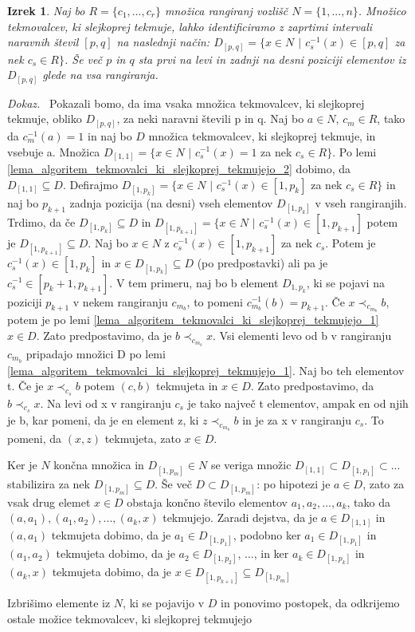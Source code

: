 \documentclass[a4paper, 12pt]{book}
\newtheorem{izrek}{Izrek}[chapter]
\newenvironment{dokaz}{\emph{Dokaz.}\ }{\hspace{\fill}{$\Box$}}
\begin{document}
\begin{izrek}
    Naj bo $R = \{ c_1, ..., c_r \}$ množica rangiranj vozlišč $N = \{ 1, ..., n \}$. Množico tekmovalcev, ki slejkoprej tekmuje, lahko identificiramo z zaprtimi intervali naravnih števil $[p, q]$ na naslednji način: $D_{[p, q]} = \{ x \in N$ $|$ $c_s^{-1}(x) \in [p, q]$ za nek $ c_s \in R\}$. Še več $p$ in $q$ sta prvi na levi in zadnji na desni poziciji elementov iz $D_{[p, q]}$ glede na vsa rangiranja.
\end{izrek}
\begin{dokaz}
    Pokazali bomo, da ima vsaka množica tekmovalcev, ki slejkoprej tekmuje, obliko $D_{[p, q]}$, za neki naravni števili p in q. Naj bo $a \in N$, $c_m \in R$, tako da $c_m^{-1}(a) = 1$ in naj bo $D$ množica tekmovalcev, ki slejkoprej tekmuje, in vsebuje a. Množica $D_{[1,1]} = \{ x \in N $ $|$ $c_s^{-1}(x) = 1$ za nek $c_s \in R \}$. Po lemi \ref{lema_algoritem_tekmovalci_ki_slejkoprej_tekmujejo_2} dobimo, da $D_{[1,1]} \subseteq D$. Defirajmo $D_{[1, p_k]} = \{ x \in N $ $|$ $c_s^{-1}(x) \in [1, p_k]$ za nek $c_s \in R\}$ in naj bo $p_{k+1}$ zadnja pozicija (na desni) vseh elementov $D_{[1, p_k]}$ v vseh rangiranjih. Trdimo, da če $D_{[1, p_k]} \subseteq D$ in $D_{[1, p_{k+1}]} = \{ x \in N $ $|$ $c_s^{-1}(x) \in [1, p_{k+1}]$ potem je $D_{[1, p_{k+1}]} \subseteq D$. Naj bo $x \in N$ z $c_s^{-1}(x) \in [1, p_{k+1}]$ za nek $c_s$. Potem je $c_s^{-1}(x) \in [1, p_k]$ in $x \in D_{[1, p_k]} \subseteq D$ (po predpostavki) ali pa je $c_s^{-1} \in [p_k + 1, p_{k+1}]$. V tem primeru, naj bo b element $D_{1,p_k}$, ki se pojavi na poziciji $p_{k+1}$ v nekem rangiranju $c_{m_b}$, to pomeni $c_{m_b}^{-1}(b) = p_{k+1}$. Če $x \prec_{c_{m_b}} b$, potem je po lemi \ref{lema_algoritem_tekmovalci_ki_slejkoprej_tekmujejo_1} $x \in D$. Zato predpostavimo, da je $b \prec_{c_{m_b}} x$. Vsi elementi levo od b v rangiranju $c_{m_b}$ pripadajo množici D po lemi \ref{lema_algoritem_tekmovalci_ki_slejkoprej_tekmujejo_1}. Naj bo teh elementov t. Če je $x \prec_{c_s} b$ potem $(c, b)$ tekmujeta in $x \in D$. Zato predpostavimo, da $b \prec_{c_s} x$. Na levi  od x v rangiranju $c_s$ je tako največ t elementov, ampak en od njih je b, kar pomeni, da je en element z, ki $z \prec_{c_{m_b}} b$ in je za x v rangiranju $c_s$. To pomeni, da $(x, z)$ tekmujeta, zato $x \in D$.

    Ker je $N$ končna množica in $D_{[1, p_m]} \in N$ se veriga množic $D_{[1, 1]} \subset D_{[1, p_1]} \subset ...$ stabilizira za nek $D_{[1, p_m]} \subseteq D$. Še več $D \subset D_{[1, p_m]}$: po hipotezi je $a \in D$, zato za vsak drug elemet $x \in D$ obstaja končno število elementov $a_1, a_2, ..., a_k$, tako da $(a, a_1),(a_1, a_2), ..., (a_k, x)$ tekmujejo. Zaradi dejstva, da je $a \in D_{[1, 1]}$ in $(a, a_1)$ tekmujeta dobimo, da je $a_1 \in D_{[1, p_1]}$, podobno ker $a_1 \in D_{[1, p_1]}$ in $(a_1, a_2)$ tekmujeta dobimo, da je $a_2 \in D_{[1, p_2]}$, ..., in ker $a_{k} \in D_{[1, p_k]}$ in $(a_k, x)$ tekmujeta dobimo, da je $x \in D_{[1, p_{k+1}]} \subseteq D_{[1, p_m]}$

    Izbrišimo elemente iz $N$, ki se pojavijo v $D$ in ponovimo postopek, da odkrijemo ostale možice tekmovalcev, ki slejkoprej tekmujejo
\end{dokaz}
\end{document}
